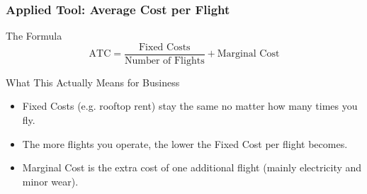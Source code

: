 \documentclass{beamer}
\begin{document}
\begin{frame}[t, shrink=10]
  \frametitle{Applied Tool: Average Cost per Flight}
 
  \begin{block}{The Formula}
  \begin{equation}
      \text{ATC} = \frac{\text{Fixed Costs}}{\text{Number of Flights}} + \text{Marginal Cost}
  \end{equation}
  \end{block}
 
  \vspace{0.1cm}
  \begin{block}{What This Actually Means for Business}
  \begin{itemize}
    \item Fixed Costs (e.g. rooftop rent) stay the same no matter how many times you fly.
    \item The more flights you operate, the lower the Fixed Cost per flight becomes.
    \item Marginal Cost is the extra cost of one additional flight (mainly electricity and minor wear).
  \end{itemize}
  \end{block}
\end{frame}
\end{document}
